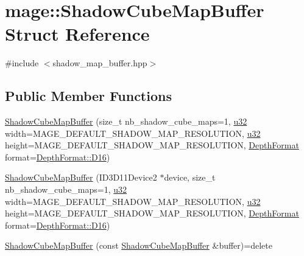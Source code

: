 \hypertarget{structmage_1_1_shadow_cube_map_buffer}{}\section{mage\+:\+:Shadow\+Cube\+Map\+Buffer Struct Reference}
\label{structmage_1_1_shadow_cube_map_buffer}


{\ttfamily \#include $<$shadow\+\_\+map\+\_\+buffer.\+hpp$>$}

\subsection*{Public Member Functions}
\begin{DoxyCompactItemize}
\item 
\hyperlink{structmage_1_1_shadow_cube_map_buffer_aa2a20d388b83656ea62153ebc54e310b}{Shadow\+Cube\+Map\+Buffer} (size\+\_\+t nb\+\_\+shadow\+\_\+cube\+\_\+maps=1, \hyperlink{namespacemage_af2b398bf98eb10351f49cad73fe2cc73}{u32} width=M\+A\+G\+E\+\_\+\+D\+E\+F\+A\+U\+L\+T\+\_\+\+S\+H\+A\+D\+O\+W\+\_\+\+M\+A\+P\+\_\+\+R\+E\+S\+O\+L\+U\+T\+I\+ON, \hyperlink{namespacemage_af2b398bf98eb10351f49cad73fe2cc73}{u32} height=M\+A\+G\+E\+\_\+\+D\+E\+F\+A\+U\+L\+T\+\_\+\+S\+H\+A\+D\+O\+W\+\_\+\+M\+A\+P\+\_\+\+R\+E\+S\+O\+L\+U\+T\+I\+ON, \hyperlink{namespacemage_aed4c3f883a30484d0a20762c06be81d4}{Depth\+Format} format=\hyperlink{namespacemage_aed4c3f883a30484d0a20762c06be81d4a6fd9ec81643ee5a57f85a71951bfe13d}{Depth\+Format\+::\+D16})
\item 
\hyperlink{structmage_1_1_shadow_cube_map_buffer_ae5bbb841f6084be74c41ff9f701e533f}{Shadow\+Cube\+Map\+Buffer} (I\+D3\+D11\+Device2 $\ast$device, size\+\_\+t nb\+\_\+shadow\+\_\+cube\+\_\+maps=1, \hyperlink{namespacemage_af2b398bf98eb10351f49cad73fe2cc73}{u32} width=M\+A\+G\+E\+\_\+\+D\+E\+F\+A\+U\+L\+T\+\_\+\+S\+H\+A\+D\+O\+W\+\_\+\+M\+A\+P\+\_\+\+R\+E\+S\+O\+L\+U\+T\+I\+ON, \hyperlink{namespacemage_af2b398bf98eb10351f49cad73fe2cc73}{u32} height=M\+A\+G\+E\+\_\+\+D\+E\+F\+A\+U\+L\+T\+\_\+\+S\+H\+A\+D\+O\+W\+\_\+\+M\+A\+P\+\_\+\+R\+E\+S\+O\+L\+U\+T\+I\+ON, \hyperlink{namespacemage_aed4c3f883a30484d0a20762c06be81d4}{Depth\+Format} format=\hyperlink{namespacemage_aed4c3f883a30484d0a20762c06be81d4a6fd9ec81643ee5a57f85a71951bfe13d}{Depth\+Format\+::\+D16})
\item 
\hyperlink{structmage_1_1_shadow_cube_map_buffer_afe0bdf6a81df1a3efde7d34b65f4e351}{Shadow\+Cube\+Map\+Buffer} (const \hyperlink{structmage_1_1_shadow_cube_map_buffer}{Shadow\+Cube\+Map\+Buffer} \&buffer)=delete

\end{DoxyCompactItemize}
